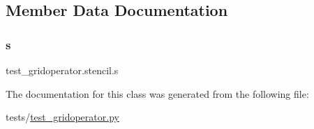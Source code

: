 \subsection{Member Data Documentation}
\mbox{\label{classtest__gridoperator_1_1stencil_af300df4225356588e4b16700ad69a05b}} 
\subsubsection{\texorpdfstring{s}{s}}
{\footnotesize\ttfamily test\+\_\+gridoperator.\+stencil.\+s}



The documentation for this class was generated from the following file\+:\begin{DoxyCompactItemize}
\item 
tests/\hyperlink{test__gridoperator_8py}{test\+\_\+gridoperator.\+py}\end{DoxyCompactItemize}
